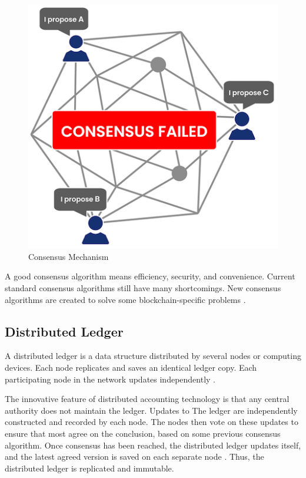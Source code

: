\begin{figure}[htbp]
\begin{center}
  \includegraphics[scale=0.55]{images/consensus.png}
\caption{Consensus Mechanism}
\label{fig:Consensus}
\end{center}
\end{figure}

A good consensus algorithm means efficiency, security, and convenience. Current standard consensus algorithms still have many shortcomings. New consensus algorithms are created to solve some blockchain-specific problems \cite{zheng2016blockchain}.

\subsection{Distributed Ledger}\label{sec:livro}
A distributed ledger is a data structure distributed by several nodes or computing devices. Each node replicates and saves an identical ledger copy. Each participating node in the network updates independently \cite{greve2018blockchain}.

The innovative feature of distributed accounting technology is that any central authority does not maintain the ledger. Updates to The ledger are independently constructed and recorded by each node. The nodes then vote on these updates to ensure that most agree on the conclusion, based on some previous consensus algorithm. Once consensus has been reached, the distributed ledger updates itself, and the latest agreed version is saved on each separate node \cite{swan2015blockchain}. Thus, the distributed ledger is replicated and immutable. 

